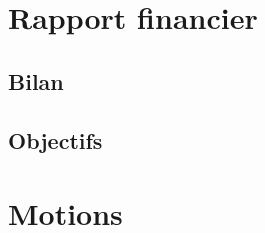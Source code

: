 \documentclass[11pt]{article}
\begin{document}
\section{Rapport financier}

\subsection{Bilan}

\subsection{Objectifs}


\section{Motions}
\end{document}
